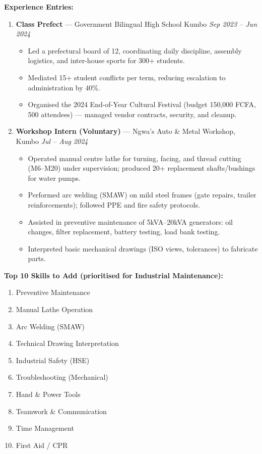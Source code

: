 \documentclass[11pt]{article}
\begin{document}
\begin{exoresolu}
    \textbf{Experience Entries:}
    \begin{enumerate}
        \item \textbf{Class Prefect} — Government Bilingual High School Kumbo \hfill \textit{Sep 2023 – Jun 2024}
              \begin{itemize}
                  \item Led a prefectural board of 12, coordinating daily discipline, assembly logistics, and inter-house sports for 300+ students.
                  \item Mediated 15+ student conflicts per term, reducing escalation to administration by 40\%.
                  \item Organised the 2024 End-of-Year Cultural Festival (budget 150,000 FCFA, 500 attendees) — managed vendor contracts, security, and cleanup.
              \end{itemize}
        \item \textbf{Workshop Intern (Voluntary)} — Ngwa's Auto \& Metal Workshop, Kumbo \hfill \textit{Jul – Aug 2024}
              \begin{itemize}
                  \item Operated manual centre lathe for turning, facing, and thread cutting (M6–M20) under supervision; produced 20+ replacement shafts/bushings for water pumps.
                  \item Performed arc welding (SMAW) on mild steel frames (gate repairs, trailer reinforcements); followed PPE and fire safety protocols.
                  \item Assisted in preventive maintenance of 5kVA–20kVA generators: oil changes, filter replacement, battery testing, load bank testing.
                  \item Interpreted basic mechanical drawings (ISO views, tolerances) to fabricate parts.
              \end{itemize}
    \end{enumerate}

    \textbf{Top 10 Skills to Add (prioritised for Industrial Maintenance):}
    \begin{enumerate}
        \item Preventive Maintenance
        \item Manual Lathe Operation
        \item Arc Welding (SMAW)
        \item Technical Drawing Interpretation
        \item Industrial Safety (HSE)
        \item Troubleshooting (Mechanical)
        \item Hand \& Power Tools
        \item Teamwork \& Communication
        \item Time Management
        \item First Aid / CPR
    \end{enumerate}


\end{exoresolu}
\end{document}
